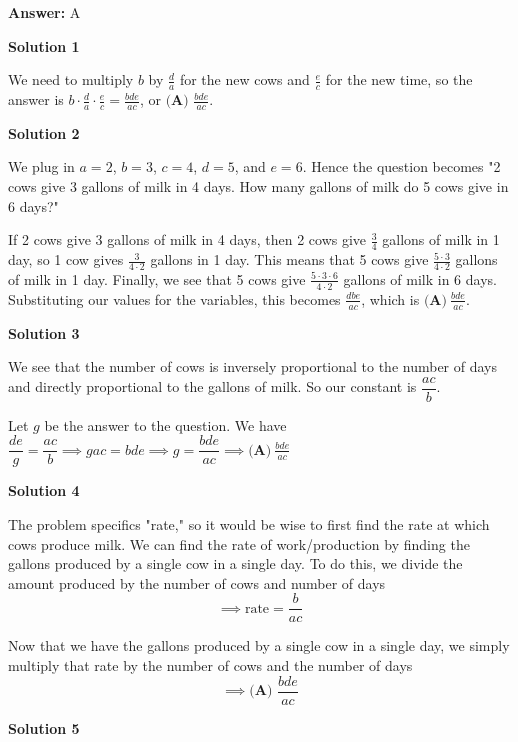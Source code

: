 \begin{enumerate}
 \textbf{Answer: }A



\textbf{Solution 1}

We need to multiply $b$ by $\frac{d}{a}$ for the new cows and $\frac{e}{c}$ for the new time, so the answer is $b\cdot \frac{d}{a}\cdot \frac{e}{c}=\frac{bde}{ac}$, or $\boxed{\textbf{(A) } \frac{bde}{ac}}$.

 



\textbf{Solution 2}

We plug in $a=2$, $b=3$, $c=4$, $d=5$, and $e=6$. Hence the question becomes "2 cows give 3 gallons of milk in 4 days. How many gallons of milk do 5 cows give in 6 days?"

 If 2 cows give 3 gallons of milk in 4 days, then 2 cows give $\frac{3}{4}$ gallons of milk in 1 day, so 1 cow gives $\frac{3}{4\cdot2}$ gallons in 1 day. This means that 5 cows give $\frac{5\cdot3}{4\cdot2}$ gallons of milk in 1 day. Finally, we see that 5 cows give $\frac{5\cdot3\cdot6}{4\cdot2}$ gallons of milk in 6 days. Substituting our values for the variables, this becomes $\frac{dbe}{ac}$, which is $\boxed{\textbf{(A)}\ \frac{bde}{ac}}$.

 



\textbf{Solution 3}

We see that the number of cows is inversely proportional to the number of days and directly proportional to the gallons of milk. So our constant is $\dfrac{ac}{b}$.

 Let $g$ be the answer to the question. We have $\dfrac{de}{g}=\dfrac{ac}{b}\implies gac=bde\implies g=\dfrac{bde}{ac}\implies\boxed{ \textbf{(A)}\ \frac{bde}{ac}}$




\textbf{Solution 4}

The problem specifics "rate," so it would be wise to first find the rate at which cows produce milk. We can find the rate of work/production by finding the gallons produced by a single cow in a single day. To do this, we divide the amount produced by the number of cows and number of days 
 \[\implies\text{rate}=\dfrac{b}{ac}\]

 Now that we have the gallons produced by a single cow in a single day, we simply multiply that rate by the number of cows and the number of days 
 \[\implies\boxed{\textbf{(A) } \dfrac{bde}{ac}}\]




\textbf{Solution 5}


\end{enumerate}
